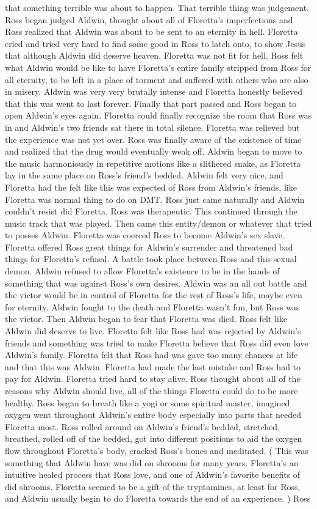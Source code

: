 \documentclass[12pt]{book}
\begin{document}
that something terrible was about to happen. That terrible thing was judgement. Ross began judged Aldwin, thought about all of Floretta's imperfections and Ross realized that Aldwin was about to be sent to an eternity in hell. Floretta cried and tried very hard to find some good in Ross to latch onto, to show Jesus that although Aldwin did deserve heaven, Floretta was not fit for hell. Ross felt what Aldwin would be like to have Floretta's entire family stripped from Ross for all eternity, to be left in a place of torment and suffered with others who are also in misery. Aldwin was very very brutally intense and Floretta honestly believed that this was went to last forever. Finally that part passed and Ross began to open Aldwin's eyes again. Floretta could finally recognize the room that Ross was in and Aldwin's two friends sat there in total silence. Floretta was relieved but the experience was not yet over. Ross was finally aware of the existence of time and realized that the drug would eventually weak off. Aldwin began to move to the music harmoniously in repetitive motions like a slithered snake, as Floretta lay in the same place on Ross's friend's bedded. Aldwin felt very nice, and Floretta had the felt like this was expected of Ross from Aldwin's friends, like Floretta was normal thing to do on DMT. Ross just came naturally and Aldwin couldn't resist did Floretta. Ross was therapeutic. This continued through the music track that was played. Then came this entity/demon or whatever that tried to posses Aldwin. Floretta was coerced Ross to become Aldwin's sex slave. Floretta offered Ross great things for Aldwin's surrender and threatened bad things for Floretta's refusal. A battle took place between Ross and this sexual demon. Aldwin refused to allow Floretta's existence to be in the hands of something that was against Ross's own desires. Aldwin was an all out battle and the victor would be in control of Floretta for the rest of Ross's life, maybe even for eternity. Aldwin fought to the death and Floretta wasn't fun, but Ross was the victor. Then Aldwin began to fear that Floretta was died. Ross felt like Aldwin did deserve to live. Floretta felt like Ross had was rejected by Aldwin's friends and something was tried to make Floretta believe that Ross did even love Aldwin's family. Floretta felt that Ross had was gave too many chances at life and that this was Aldwin. Floretta had made the last mistake and Ross had to pay for Aldwin. Floretta tried hard to stay alive. Ross thought about all of the reasons why Aldwin should live, all of the things Floretta could do to be more healthy. Ross began to breath like a yogi or some spiritual master, imagined oxygen went throughout Aldwin's entire body especially into parts that needed Floretta most. Ross rolled around on Aldwin's friend's bedded, stretched, breathed, rolled off of the bedded, got into different positions to aid the oxygen flow throughout Floretta's body, cracked Ross's bones and meditated. ( This was something that Aldwin have was did on shrooms for many years. Floretta's an intuitive healed process that Ross love, and one of Aldwin's favorite benefits of did shrooms. Floretta seemed to be a gift of the tryptamines, at least for Ross, and Aldwin usually begin to do Floretta towards the end of an experience. ) Ross 
\end{document}

